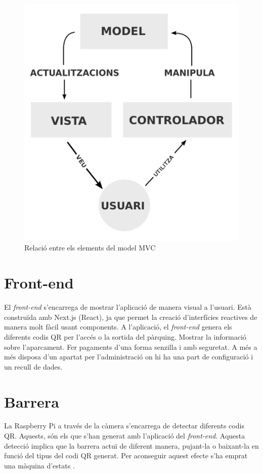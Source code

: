 \begin{figure}[H]
    \begin{center}
        \includegraphics[scale=0.20]{Fotos/arquitectura_mvc.png}
    \end{center}
    \caption{Relació entre els elements del model MVC \autocite{mvc}}
    \label{fig:compiler_phases}
\end{figure}

\section{Front-end}

El \emph{front-end} s'encarrega de mostrar l'aplicació de manera visual a l'usuari.
Està construïda amb Next.js (React), ja que permet la creació d'interfícies reactives
de manera molt fàcil usant components. A l'aplicació, el \emph{front-end}
genera els diferents codis QR per l'accés o la sortida del pàrquing.
Mostrar la informació sobre l'aparcament. Fer pagaments d'una forma senzilla i amb seguretat.
A més a més disposa d'un apartat per l'administració on hi ha una part de configuració i
un recull de dades.

\section{Barrera}

La Raspberry Pi a través de la càmera s'encarrega de detectar diferents codis QR. Aquests, són els
que s'han generat amb l'aplicació del \emph{front-end}. Aquesta detecció implica que la barrera
actuï de diferent manera, pujant-la o baixant-la en funció del tipus del codi QR generat.
Per aconseguir aquest efecte s'ha emprat una màquina d'estats \autocite{maq_estats}.